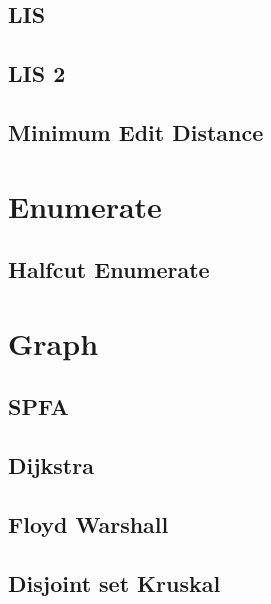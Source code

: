         \subsection{LIS}
                  
        \subsection{LIS 2}
                  
        \subsection{Minimum Edit Distance}
                  

\section{Enumerate} 
        \subsection{Halfcut Enumerate}
                

\section{Graph}
        \subsection{SPFA}
                
        \subsection{Dijkstra}
                
        \subsection{Floyd Warshall}
                
        \subsection{Disjoint set Kruskal}
                
